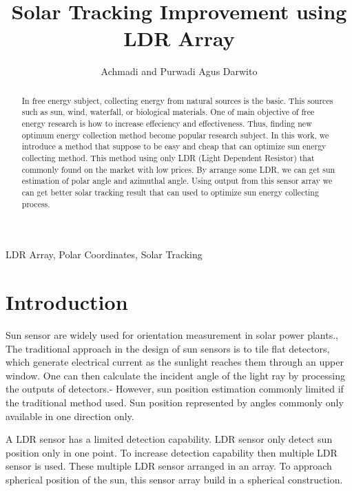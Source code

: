 \documentclass[journal]{IEEEtran}
\begin{document}
\title{Solar Tracking Improvement using LDR Array}

\author{Achmadi and Purwadi Agus Darwito}

\maketitle


\begin{abstract}

In free energy subject, collecting energy from natural sources is the basic.
This sources such as sun, wind, waterfall, or biological materials.
One of main objective of free energy research is how to increase effeciency and effectiveness.
Thus, finding new optimum energy collection method become popular research subject.
In this work, we introduce a method that suppose to be easy and cheap that can optimize sun energy collecting method.
This method using only LDR (Light Dependent Resistor) that commonly found on the market with low prices.
By arrange some LDR, we can get sun estimation of polar angle and azimuthal angle.
Using output from this sensor array we can get better solar tracking result that can used to optimize sun energy collecting process.\cite{sensor_array}
\end{abstract}

\begin{IEEEkeywords}
LDR Array, Polar Coordinates, Solar Tracking
\end{IEEEkeywords}

\IEEEpeerreviewmaketitle



\section{Introduction}
Sun sensor are widely used for orientation measurement in solar power plants.\cite{sun_sensor_1},\cite{sun_sensor_2}
The traditional approach in the design of sun sensors is to tile flat detectors, which generate electrical current as the sunlight reaches them through an upper window. One can then calculate the incident angle of the light ray by processing the outputs of detectors.\cite{old_sensor_1}-\cite{old_sensor_4}
However, sun position estimation commonly limited if the traditional method used.
Sun position represented by angles commonly only available in one direction only.

A LDR sensor has a limited detection capability.
LDR sensor only detect sun position only in one point.
To increase detection capability then multiple LDR sensor is used.
These multiple LDR sensor arranged in an array.
To approach spherical position of the sun, this sensor array build in a spherical construction.
\end{document}
